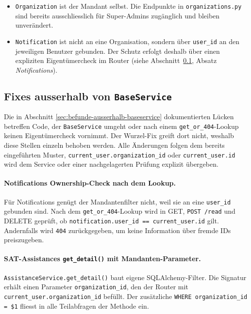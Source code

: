 \begin{itemize}
    \item \texttt{Organization} ist der Mandant selbst. Die Endpunkte
          in \texttt{organizations.py} sind bereits ausschliesslich für
          Super-Admins zugänglich und bleiben unverändert.
    \item \texttt{Notification} ist nicht an eine Organisation, sondern
          über \texttt{user\_id} an den jeweiligen Benutzer gebunden.
          Der Schutz erfolgt deshalb über einen expliziten
          Eigentümercheck im Router (siehe
          Abschnitt~\ref{sec:patch-zusatzbefunde}, Absatz
          \emph{Notifications}).
\end{itemize}

\subsection{Fixes ausserhalb von \texttt{BaseService}}
\label{sec:patch-zusatzbefunde}

Die in Abschnitt \ref{sec:befunde-ausserhalb-baseservice} dokumentierten
Lücken betreffen Code, der \texttt{BaseService} umgeht oder nach einem
\texttt{get\_or\_404}-Lookup keinen Eigentümercheck vornimmt. Der
Wurzel-Fix greift dort nicht, weshalb diese Stellen einzeln behoben
werden. Alle Änderungen folgen dem bereits eingeführten Muster,
\texttt{current\_user.\allowbreak organization\_id} oder
\texttt{current\_user.\allowbreak id} wird dem Service oder einer
nachgelagerten Prüfung explizit übergeben.

\paragraph{Notifications \textendash{} Ownership-Check nach dem Lookup.}
Für Notifications genügt der Mandantenfilter nicht, weil sie an eine
\texttt{user\_id} gebunden sind. Nach dem \texttt{get\_or\_404}-Lookup
wird in GET, \texttt{POST /read} und DELETE geprüft, ob
\texttt{notification.user\_id == current\_user.id} gilt. Andernfalls
wird \texttt{404} zurückgegeben, um keine Information über fremde IDs
preiszugeben.

\paragraph{SAT-Assistances \textendash{} \texttt{get\_detail()} mit Mandanten-Parameter.}
\texttt{AssistanceService.get\_detail()} baut eigene SQLAlchemy-Filter.
Die Signatur erhält einen Parameter \texttt{organization\_id}, den der
Router mit \texttt{current\_user.\allowbreak organization\_id} befüllt.
Der zusätzliche \texttt{WHERE organization\_id = \$1} fliesst in alle
Teilabfragen der Methode ein.

